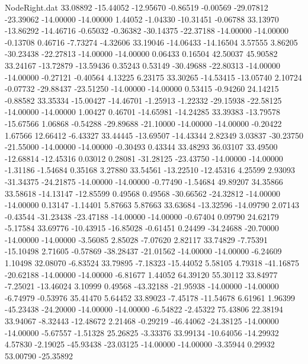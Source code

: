 \begin{filecontents}{NodeRight.dat}
  33.08892  -15.44052  -12.95670    -0.86519   -0.00569  -29.07812  -23.39062  -14.00000  -14.00000    1.44052   -1.04330  -10.31451   -0.06788
  33.13970  -13.86292  -14.46716    -0.65032   -0.36382  -30.14375  -22.37188  -14.00000  -14.00000   -0.13708    0.46716   -7.73274   -4.32606
  33.19046  -14.06433  -14.16504     3.57555    3.86205  -30.23438  -22.27813  -14.00000  -14.00000    0.06433    0.16504   42.50037   45.90582
  33.24167  -13.72879  -13.59436     0.35243    0.53149  -30.49688  -22.80313  -14.00000  -14.00000   -0.27121   -0.40564    4.13225    6.23175
  33.30265  -14.53415  -13.05740     2.10724   -0.07732  -29.88437  -23.51250  -14.00000  -14.00000    0.53415   -0.94260   24.14215   -0.88582
  33.35334  -15.00427  -14.46701    -1.25913   -1.22332  -29.15938  -22.58125  -14.00000  -14.00000    1.00427    0.46701  -14.65981  -14.24285
  33.39383  -13.79578  -15.67566     1.06868   -0.54288  -29.89688  -21.10000  -14.00000  -14.00000   -0.20422    1.67566   12.66412   -6.43327
  33.44445  -13.69507  -14.43344     2.82349    3.03837  -30.23750  -21.55000  -14.00000  -14.00000   -0.30493    0.43344   33.48293   36.03107
  33.49500  -12.68814  -12.45316     0.03012    0.28081  -31.28125  -23.43750  -14.00000  -14.00000   -1.31186   -1.54684    0.35168    3.27880
  33.54561  -13.22510  -12.45316     4.25599    2.93093  -31.34375  -24.21875  -14.00000  -14.00000   -0.77490   -1.54684   49.89207   34.35866
  33.58618  -14.13147  -12.85599     0.49568    0.49568  -30.66562  -24.32812  -14.00000  -14.00000    0.13147   -1.14401    5.87663    5.87663
  33.63684  -13.32596  -14.09790     2.07143   -0.43544  -31.23438  -23.47188  -14.00000  -14.00000   -0.67404    0.09790   24.62179   -5.17584
  33.69776  -10.43915  -16.85028    -0.61451    0.24499  -34.24688  -20.70000  -14.00000  -14.00000   -3.56085    2.85028   -7.07620    2.82117
  33.74829   -7.75391  -15.10498     2.71605   -0.57869  -38.28437  -21.01562  -14.00000  -14.00000   -6.24609    1.10498   32.08070   -6.83524
  33.79895   -7.18323  -15.44052     5.58105    4.79318  -41.16875  -20.62188  -14.00000  -14.00000   -6.81677    1.44052   64.39120   55.30112
  33.84977   -7.25021  -13.46024     3.10999    0.49568  -43.32188  -21.95938  -14.00000  -14.00000   -6.74979   -0.53976   35.41470    5.64452
  33.89023   -7.45178  -11.54678     6.61961    1.96399  -45.23438  -24.20000  -14.00000  -14.00000   -6.54822   -2.45322   75.43806   22.38194
  33.94067   -8.32443  -12.48672     2.21468   -0.29219  -46.44062  -24.38125  -14.00000  -14.00000   -5.67557   -1.51328   25.26825   -3.33376
  33.99134  -10.64056  -14.29932     4.57830   -2.19025  -45.93438  -23.03125  -14.00000  -14.00000   -3.35944    0.29932   53.00790  -25.35892

\end{filecontents}
